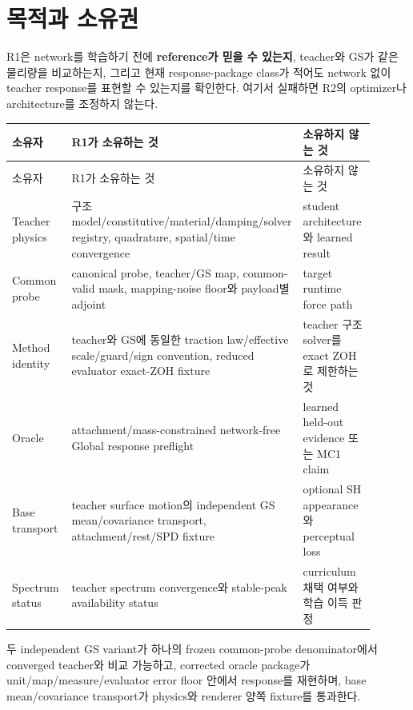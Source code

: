 \documentclass[10pt]{article}
\begin{document}
\tableofcontents
\newpage

\section{목적과 소유권}
\label{sec:r1-chapter-1}
R1은 network를 학습하기 전에 \textbf{reference가 믿을 수 있는지}, teacher와 GS가 같은 물리량을
비교하는지, 그리고 현재 response-package class가 적어도 network 없이 teacher response를 표현할 수 있는지를
확인한다. 여기서 실패하면 R2의 optimizer나 architecture를 조정하지 않는다.

\begin{longtable}{L{0.24\linewidth}L{0.31\linewidth}L{0.35\linewidth}}
\toprule
소유자 & R1가 소유하는 것 & 소유하지 않는 것\\
\midrule
\endfirsthead
\toprule
소유자 & R1가 소유하는 것 & 소유하지 않는 것\\
\midrule
\endhead
Teacher physics & 구조 model/constitutive/material/damping/solver registry, quadrature, spatial/time convergence & student architecture와 learned result\\
Common probe & canonical probe, teacher/GS map, common-valid mask, mapping-noise floor와 payload별 adjoint & target runtime force path\\
Method identity & teacher와 GS에 동일한 traction law/effective scale/guard/sign convention, reduced evaluator exact-ZOH fixture & teacher 구조 solver를 exact ZOH로 제한하는 것\\
Oracle & attachment/mass-constrained network-free Global response preflight & learned held-out evidence 또는 MC1 claim\\
Base transport & teacher surface motion의 independent GS mean/covariance transport, attachment/rest/SPD fixture & optional SH appearance와 perceptual loss\\
Spectrum status & teacher spectrum convergence와 stable-peak availability status & curriculum 채택 여부와 학습 이득 판정\\
\bottomrule
\end{longtable}

 두 independent GS variant가 하나의 frozen common-probe denominator에서
converged teacher와 비교 가능하고, corrected oracle package가 unit/map/measure/evaluator error floor 안에서
response를 재현하며, base mean/covariance transport가 physics와 renderer 양쪽 fixture를 통과한다.
\end{document}
